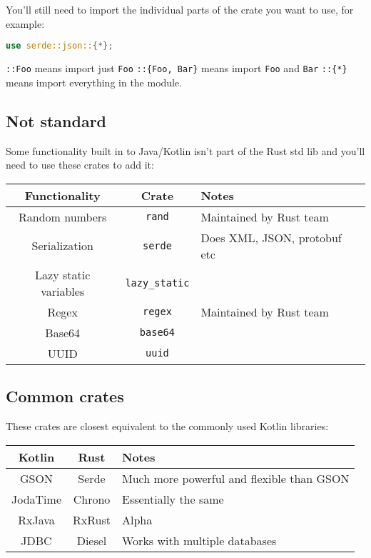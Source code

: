 \documentclass[a4paper,11pt]{article}
\begin{document}
You'll still need to import the individual parts of the crate you want to use, for example:
\begin{lstlisting}[language=Rust,frame=single]
use serde::json::{*};
\end{lstlisting}
\lstinline|::Foo| means import just \lstinline|Foo|
\newline
\lstinline|::{Foo, Bar}| means import \lstinline|Foo| and \lstinline|Bar|
\newline
\lstinline|::{*}| means import everything in the module.

\subsection{Not standard}
Some functionality built in to Java/Kotlin isn't part of the Rust std lib and you'll need to use these crates to add it:

\renewcommand{\arraystretch}{1.3}

\begin{center}
\begin{tabular}{ c|c|l } 

 Functionality & Crate & Notes \\ 
 \hline
 Random numbers & \lstinline|rand| & Maintained by Rust team \\
 Serialization & \lstinline|serde| & Does XML, JSON, protobuf etc \\
 Lazy static variables & \lstinline|lazy_static| & \\
 Regex & \lstinline|regex| & Maintained by Rust team \\
 Base64 & \lstinline|base64| & \\
 UUID & \lstinline|uuid| & \\
 
\end{tabular}
\end{center}

\subsection{Common crates}
These crates are closest equivalent to the commonly used Kotlin libraries:
\begin{center}
\begin{tabular}{ c|c|l } 
 Kotlin & Rust & Notes \\ 
 \hline
 GSON & Serde & Much more powerful and flexible than GSON \\
 JodaTime & Chrono & Essentially the same \\
 RxJava & RxRust & Alpha \\
 JDBC & Diesel & Works with multiple databases \\
\end{tabular}
\end{center}
\end{document}
